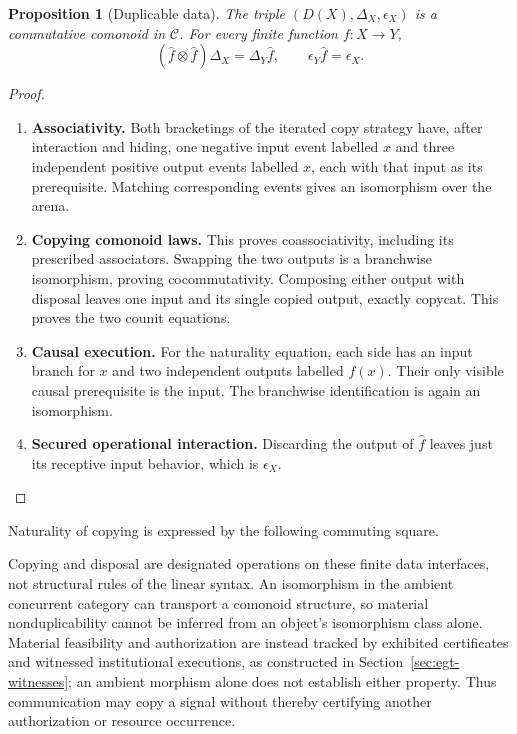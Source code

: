 \documentclass[11pt,a4paper]{article}
\numberwithin{equation}{section}
\newtheorem{proposition}[theorem]{Proposition}
\theoremstyle{definition}
\theoremstyle{remark}
\theoremstyle{plain}
\begin{document}
\begin{proposition}[Duplicable data]
\label{prop:egt-data-comonoid}
The triple $(D(X),\Delta_X,\epsilon_X)$ is a commutative comonoid
in $\mathcal C$. For every finite function $f:X\to Y$,
\[
 (\widehat f\otimes\widehat f)\Delta_X
   =\Delta_Y\widehat f,\qquad
 \epsilon_Y\widehat f=\epsilon_X.
\]
\end{proposition}
\begin{proof}
\leavevmode
\begin{enumerate}[label=\textup{(\arabic*)},leftmargin=*,itemsep=4pt,topsep=3pt]
  \item \textbf{Associativity.} Both bracketings of the iterated copy strategy have, after interaction
and hiding, one negative input event labelled $x$ and three independent
positive output events labelled $x$, each with that input as its
prerequisite. Matching corresponding events gives an isomorphism over
the arena.
  \item \textbf{Copying comonoid laws.} This proves coassociativity, including its prescribed
associators. Swapping the two outputs is a branchwise isomorphism,
proving cocommutativity. Composing either output with disposal leaves
one input and its single copied output, exactly copycat. This proves
the two counit equations.
  \item \textbf{Causal execution.} For the naturality equation, each side has an input branch for $x$
and two independent outputs labelled $f(x)$. Their only visible causal
prerequisite is the input. The branchwise identification is again an
isomorphism.
  \item \textbf{Secured operational interaction.} Discarding the output of $\widehat f$ leaves just its
receptive input behavior, which is $\epsilon_X$.
\end{enumerate}
\end{proof}

\noindent Naturality of copying is expressed by the following commuting square.
\begin{center}
\end{center}

Copying and disposal are designated operations on these finite data
interfaces, not structural rules of the linear syntax. An isomorphism in
the ambient concurrent category can transport a comonoid structure, so
material nonduplicability cannot be inferred from an object's isomorphism
class alone. Material feasibility and authorization are instead tracked by
exhibited certificates and witnessed institutional executions, as constructed
in Section~\ref{sec:egt-witnesses}; an ambient morphism alone does not
establish either property. Thus communication may copy a signal without
thereby certifying another authorization or resource occurrence.
\end{document}
